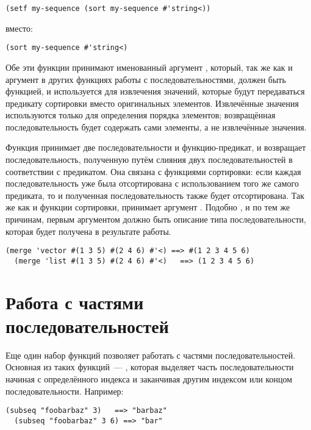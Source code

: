 \begin{lstlisting}[style=lisprepl]
  (setf my-sequence (sort my-sequence #'string<))
\end{lstlisting}

\noindent{}вместо:

\begin{lstlisting}[style=lisprepl]
  (sort my-sequence #'string<)
\end{lstlisting}

Обе эти функции принимают именованный аргумент , который, так же как и аргумент
 в других функциях работы с последовательностями, должен быть функцией, и
используется для извлечения значений, которые будут передаваться предикату сортировки
вместо оригинальных элементов.  Извлечённые значения используются только для определения
порядка элементов; возвращённая последовательность будет содержать сами элементы, а не
извлечённые значения.

Функция  принимает две последовательности и функцию-предикат, и возвращает
последовательность, полученную путём слияния двух последовательностей в соответствии с
предикатом.  Она связана с функциями сортировки: если каждая последовательность
уже была отсортирована с использованием того же самого предиката, то и полученная
последовательность также будет отсортирована.  Так же как и функции сортировки,
 принимает аргумент .  Подобно , и по тем же
причинам, первым аргументом  должно быть описание типа последовательности,
которая будет получена в результате работы.

\begin{lstlisting}[style=lisprepl]
  (merge 'vector #(1 3 5) #(2 4 6) #'<) ==> #(1 2 3 4 5 6)
  (merge 'list #(1 3 5) #(2 4 6) #'<)   ==> (1 2 3 4 5 6)
\end{lstlisting}

\section{Работа с частями последовательностей}

Еще один набор функций позволяет работать с частями последовательностей.  Основная из
таких функций~--- , которая выделяет часть последовательности
начиная с определённого индекса и заканчивая другим индексом или концом
последовательности.  Например:

\begin{lstlisting}[style=lisprepl]
  (subseq "foobarbaz" 3)   ==> "barbaz"
  (subseq "foobarbaz" 3 6) ==> "bar"
\end{lstlisting}

